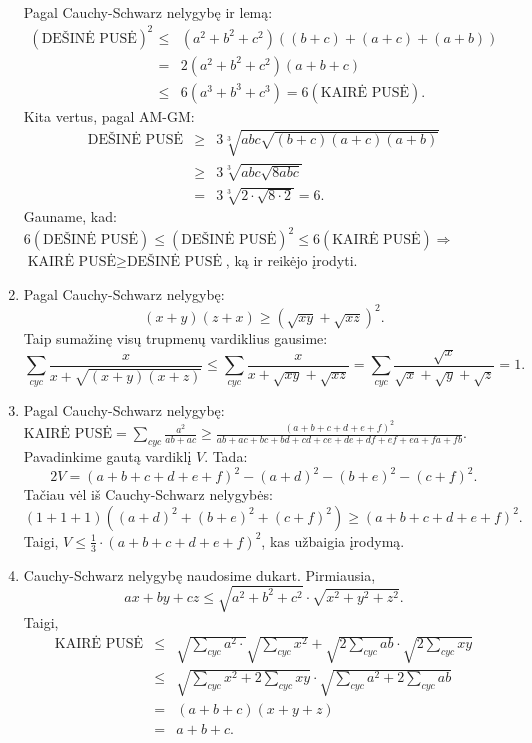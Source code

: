 \begin{enumerate}
    \\Pagal Cauchy-Schwarz nelygybę ir lemą:
    \begin{eqnarray*}(\text{DEŠINĖ
    PUSĖ})^2&\leq&(a^2+b^2+c^2)((b+c)+(a+c)+(a+b))\\
    &=&2(a^2+b^2+c^2)(a+b+c)\\ &\leq&6(a^3+b^3+c^3)=6(\text{KAIRĖ
    PUSĖ}).\end{eqnarray*} Kita vertus, pagal AM-GM:
    \begin{eqnarray*}\text{DEŠINĖ
    PUSĖ}&\geq&3\sqrt[3]{abc\sqrt{(b+c)(a+c)(a+b)}}\\&\geq&3{\sqrt[3]{abc\sqrt{8abc}}}\\&=&3\sqrt[3]{2\cdot\sqrt{8\cdot2}}=6.\end{eqnarray*}
    Gauname, kad:\\ $6(\text{DEŠINĖ PUSĖ})\leq(\text{DEŠINĖ
    PUSĖ})^2\leq6(\text{KAIRĖ PUSĖ})\Rightarrow$\\ $\text{KAIRĖ
    PUSĖ}\geq\text{DEŠINĖ PUSĖ}$, ką ir reikėjo įrodyti.
\item
    Pagal Cauchy-Schwarz nelygybę:
    $$(x+y)(z+x)\geq(\sqrt{xy}+\sqrt{xz})^2.$$ Taip sumažinę visų trupmenų
    vardiklius gausime:
    $$\sum_{cyc}{\frac{x}{x+\sqrt{(x+y)(x+z)}}}\leq\sum_{cyc}{\frac{x}{x+\sqrt{xy}+\sqrt{xz}}}=\sum_{cyc}{\frac{\sqrt{x}}{\sqrt{x}+\sqrt{y}+\sqrt{z}}}=1.$$
\item
    Pagal Cauchy-Schwarz nelygybę: \\$\mbox{KAIRĖ PUSĖ} =
    \sum\limits_{cyc}\frac{a^2}{ab+ac} \geq
    \frac{(a+b+c+d+e+f)^2}{ab+ac+bc+bd+cd+ce+de+df+ef+ea+fa+fb}.$
    \\Pavadinkime gautą vardiklį $V$. Tada:
    $$2V=(a+b+c+d+e+f)^2-(a+d)^2-(b+e)^2-(c+f)^2.$$ Tačiau vėl iš
    Cauchy-Schwarz nelygybės:
    $$\left(1+1+1\right)\left((a+d)^2+(b+e)^2+(c+f)^2\right)\geq(a+b+c+d+e+f)^2.$$
    Taigi, $V\leq\frac{1}{3}\cdot(a+b+c+d+e+f)^2$, kas užbaigia įrodymą.
\item
    Cauchy-Schwarz nelygybę naudosime dukart. Pirmiausia,
    $$ax+by+cz\leq\sqrt{a^2+b^2+c^2}\cdot\sqrt{x^2+y^2+z^2}.$$ Taigi,
    \begin{eqnarray*}\text{KAIRĖ
    PUSĖ}&\leq&\sqrt{\sum_{cyc}{a^2}\cdot}\sqrt{\sum_{cyc}{x^2}}+\sqrt{2\sum_{cyc}{ab}}\cdot\sqrt{2\sum_{cyc}{xy}}\\
    &\leq&\sqrt{\sum_{cyc}{x^2}+2\sum_{cyc}{xy}}\cdot\sqrt{\sum_{cyc}{a^2}+2\sum_{cyc}{ab}}\\
    &=&(a+b+c)(x+y+z)\\ &=&a+b+c.\end{eqnarray*}

\end{enumerate}
